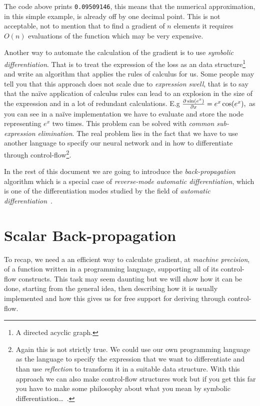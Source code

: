 \documentclass{article}
\begin{document}
The code above prints \texttt{0.09509146}, this means
that the numerical approximation, in this simple example, is already off by one
decimal point. This is not acceptable, not to mention that to find a gradient
of \(n\) elements it requires \(O(n)\) evaluations of the function which may be
very expensive.

Another way to automate the calculation of the gradient is to use
\emph{symbolic differentiation}. That is to treat the expression of the loss
as an data structure\footnote{A directed acyclic graph.} and write an algorithm
that applies the rules of calculus for us. Some people may tell you that this
approach does not scale due to \emph{expression swell}, that is to say that the
na\"ive application of calculus rules can lead to an explosion in the size of
the expression and in a lot of redundant calculations. E.g
\(\textstyle\frac{\partial\sin(e^x)}{\partial x} = e^x \cos(e^x),\) as you can see in a na\"ive
implementation we have to evaluate and store the node representing \(e^x\) two
times. This problem can be solved with \emph{common sub-expression
elimination}. The real problem lies in the fact that we have to use another
language to specify our neural network and in how to differentiate through
control-flow\footnote{Again this is not strictly true. We could use our own
programming language as the language to specify the expression that we want to
differentiate and than use \emph{reflection} to transform it in a suitable data
structure. With this approach we can also make control-flow structures work but
if you get this far you have to make some philosophy about what you mean by
symbolic differentiation\dots~\cite{equiv}.}.

In the rest of this document we are going to introduce the
\emph{back-propagation} algorithm which is a special case of \emph{reverse-mode
automatic differentiation}, which is one of the differentiation modes studied
by the field of \emph{automatic differentiation}~\cite{survey,griewank}.

\section{Scalar Back-propagation}

To recap, we need a an efficient way to calculate gradient, at \emph{machine
precision}, of a function written in a programming language, supporting all of
its control-flow constructs. This task may seem daunting but we will show how
it can be done, starting from the general idea, then describing how it is
usually implemented and how this gives us for free support for deriving through
control-flow.
\end{document}
